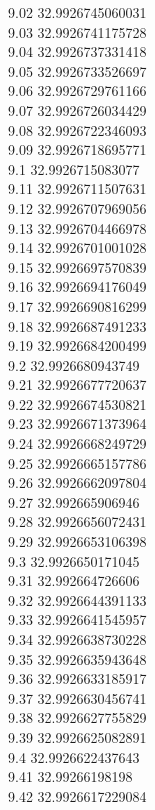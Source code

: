 {9.02	32.9926745060031\\
9.03	32.9926741175728\\
9.04	32.9926737331418\\
9.05	32.9926733526697\\
9.06	32.9926729761166\\
9.07	32.9926726034429\\
9.08	32.9926722346093\\
9.09	32.9926718695771\\
9.1	32.9926715083077\\
9.11	32.9926711507631\\
9.12	32.9926707969056\\
9.13	32.9926704466978\\
9.14	32.9926701001028\\
9.15	32.9926697570839\\
9.16	32.9926694176049\\
9.17	32.9926690816299\\
9.18	32.9926687491233\\
9.19	32.9926684200499\\
9.2	32.9926680943749\\
9.21	32.9926677720637\\
9.22	32.9926674530821\\
9.23	32.9926671373964\\
9.24	32.9926668249729\\
9.25	32.9926665157786\\
9.26	32.9926662097804\\
9.27	32.992665906946\\
9.28	32.9926656072431\\
9.29	32.9926653106398\\
9.3	32.9926650171045\\
9.31	32.992664726606\\
9.32	32.9926644391133\\
9.33	32.9926641545957\\
9.34	32.9926638730228\\
9.35	32.9926635943648\\
9.36	32.9926633185917\\
9.37	32.9926630456741\\
9.38	32.9926627755829\\
9.39	32.9926625082891\\
9.4	32.9926622437643\\
9.41	32.99266198198\\
9.42	32.9926617229084\\
}

